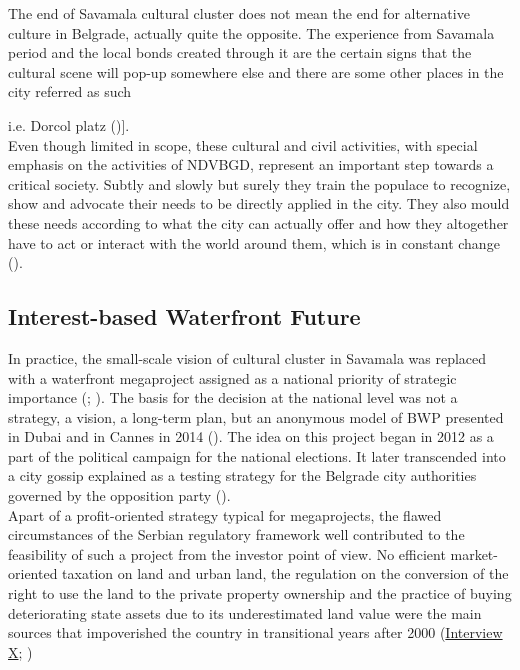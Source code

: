 \documentclass[11pt]{report}
\begin{document}
The end of Savamala cultural cluster does not mean the end for alternative culture in Belgrade, actually quite the opposite. The experience from Savamala period and the local bonds created through it are the certain signs that the cultural scene will pop-up somewhere else and there are some other places in the city referred as such {i.e. Dorcol platz (\cite{ref media})].
\\

Even though limited in scope, these cultural and civil activities, with special emphasis on the activities of NDVBGD, represent an important step towards a critical society.
Subtly and slowly but surely they train the populace to recognize, show and advocate their needs to be directly applied in the city.
They also mould these needs according to what the city can actually offer and how they altogether have to act or interact with the world around them, which is in constant change (\href{Harvey}{\cite{harvey_condition_2003}}). 

\subsection{Interest-based Waterfront Future}

In practice, the small-scale vision of cultural cluster in Savamala was replaced with a waterfront megaproject assigned as a national priority of strategic importance (\href{Decision}{\cite{DecisionOfGovernment2014}}; \href{Ordinance}{\cite{Ordinance2015}}). 
The basis for the decision at the national level was not a strategy, a vision, a long-term plan, but an anonymous model of BWP presented in Dubai and in Cannes in 2014 (\href{Politika}{\cite{(Politika, 13. mart 2014)}}).
The idea on this project began in 2012 as a part of the political campaign for the national elections.
It later transcended into a city gossip explained as a testing strategy for the Belgrade city authorities governed by the opposition party (\href{Vreme}{\cite{ref Vreme Djilas}}). 
\\

Apart of a profit-oriented strategy typical for megaprojects, the flawed circumstances of the Serbian regulatory framework well contributed to the feasibility of such a project from the investor point of view.
No efficient market-oriented taxation on land and urban land, the regulation on the conversion of the right to use the land to the private property ownership and the practice of buying deteriorating state assets due to its underestimated land value were the main sources that impoverished the country in transitional years after 2000
(\href{InterviewX}{Interview X}; \href{Zekovic}{\cite{????????}})
\\

}
\end{document}
